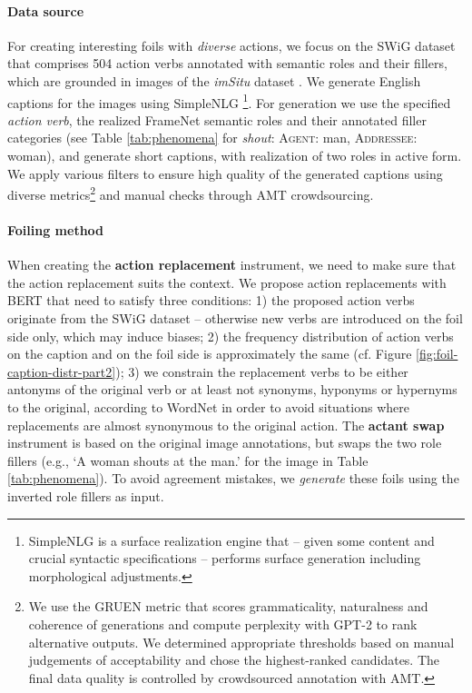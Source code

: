 \documentclass[11pt]{article}
\begin{document}
\paragraph{Data source}
For creating interesting foils with \emph{diverse} actions, we focus on the SWiG dataset \cite{DBLP:conf/eccv/PrattYWFK20} that comprises 504 action verbs annotated with semantic roles and their fillers, which are grounded in images of the \textit{imSitu} dataset \cite{Yatskar_2016_CVPR}. We generate English captions for the images 
using SimpleNLG \cite{gatt-reiter-2009-simplenlg}\footnote{SimpleNLG is a surface realization engine that -- given some content and crucial syntactic specifications -- performs surface generation including  morphological adjustments.}. For generation we use the specified \textit{action verb}, the  realized FrameNet semantic roles and their annotated filler categories (see Table \ref{tab:phenomena} for \textit{shout}: \textsc{Agent}: man, \textsc{Addressee}: woman), and generate short captions, with realization of  two roles in active form.
We apply various filters to ensure high quality of the generated captions using diverse metrics\footnote{We use the GRUEN metric \citep{zhu-bhat-2020-gruen} that scores grammaticality, naturalness and coherence of generations and compute perplexity with GPT-2 to rank alternative outputs. We determined appropriate  thresholds based on manual judgements of acceptability and chose the highest-ranked candidates. The final data quality is controlled by crowdsourced annotation with AMT.} and manual checks through AMT crowdsourcing.

\paragraph{Foiling method}
When creating the \textbf{action replacement} instrument, we need to make sure that the action replacement suits the context. We propose action replacements with BERT \cite{devlin2019bert} that need to satisfy three conditions: 1) the proposed action verbs originate from the SWiG dataset -- otherwise new verbs are introduced on the foil side only, which may induce biases;
2) the frequency distribution of action verbs on the caption and on the foil side is approximately the same (cf. Figure \ref{fig:foil-caption-distr-part2});
3) we constrain the replacement verbs to be either antonyms of the original verb or at least not synonyms, hyponyms or hypernyms to the original, according to WordNet \cite{wordnet} in order to avoid situations where replacements are almost synonymous to the original action.
The \textbf{actant swap} instrument is based on the original image annotations, but swaps the two role fillers (e.g., `A woman shouts at the man.' for the image in Table \ref{tab:phenomena}). To avoid agreement mistakes, we \textit{generate} these foils using the inverted role fillers as input. 
\end{document}
